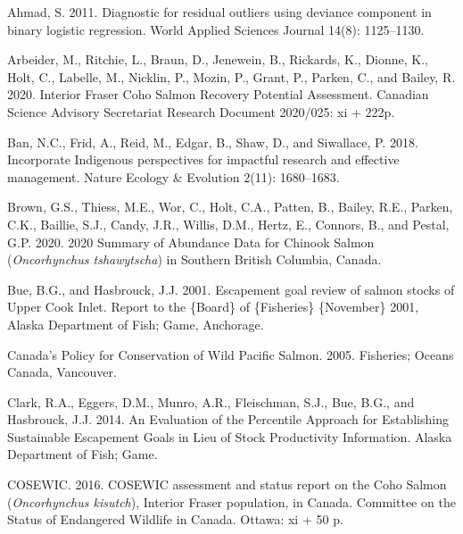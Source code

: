 \documentclass[11pt]{book}
\begin{document}
\hypertarget{refs}{}
\begin{CSLReferences}{1}{0}
%
Ahmad, S. 2011. Diagnostic for residual outliers using deviance component in binary logistic regression. World Applied Sciences Journal 14(8): 1125--1130.

%
Arbeider, M., Ritchie, L., Braun, D., Jenewein, B., Rickards, K., Dionne, K., Holt, C., Labelle, M., Nicklin, P., Mozin, P., Grant, P., Parken, C., and Bailey, R. 2020. Interior {Fraser} {Coho} {Salmon} {Recovery} {Potential} {Assessment}. Canadian Science Advisory Secretariat Research Document 2020/025: xi + 222p.

%
Ban, N.C., Frid, A., Reid, M., Edgar, B., Shaw, D., and Siwallace, P. 2018. Incorporate {Indigenous} perspectives for impactful research and effective management. Nature Ecology \& Evolution 2(11): 1680--1683.

%
Brown, G.S., Thiess, M.E., Wor, C., Holt, C.A., Patten, B., Bailey, R.E., Parken, C.K., Baillie, S.J., Candy, J.R., Willis, D.M., Hertz, E., Connors, B., and Pestal, G.P. 2020. 2020 {Summary} of {Abundance} {Data} for {Chinook} {Salmon} (\emph{{Oncorhynchus} tshawytscha}) in {Southern} {British} {Columbia}, {Canada}.

%
Bue, B.G., and Hasbrouck, J.J. 2001. Escapement goal review of salmon stocks of {Upper} {Cook} {Inlet}. Report to the \{Board\} of \{Fisheries\} \{November\} 2001, Alaska Department of Fish; Game, Anchorage.

%
Canada's {Policy} for {Conservation} of {Wild} {Pacific} {Salmon}. 2005. Fisheries; Oceans Canada, Vancouver.

%
Clark, R.A., Eggers, D.M., Munro, A.R., Fleischman, S.J., Bue, B.G., and Hasbrouck, J.J. 2014. An {Evaluation} of the {Percentile} {Approach} for {Establishing} {Sustainable} {Escapement} {Goals} in {Lieu} of {Stock} {Productivity} {Information}. Alaska Department of Fish; Game.

%
COSEWIC. 2016. {COSEWIC} assessment and status report on the {Coho} {Salmon} (\emph{{Oncorhynchus} kisutch}), {Interior} {Fraser} population, in {Canada}. Committee on the Status of Endangered Wildlife in Canada. Ottawa: xi + 50 p.


\end{CSLReferences}
\end{document}
